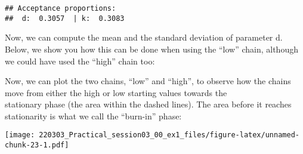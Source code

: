 \documentclass[
]{article}
\newenvironment{Shaded}{\begin{snugshade}}{\end{snugshade}}
\newcommand{\AttributeTok}[1]{\textcolor[rgb]{0.77,0.63,0.00}{#1}}
\newcommand{\CommentTok}[1]{\textcolor[rgb]{0.56,0.35,0.01}{\textit{#1}}}
\newcommand{\DecValTok}[1]{\textcolor[rgb]{0.00,0.00,0.81}{#1}}
\newcommand{\FloatTok}[1]{\textcolor[rgb]{0.00,0.00,0.81}{#1}}
\newcommand{\FunctionTok}[1]{\textcolor[rgb]{0.00,0.00,0.00}{#1}}
\newcommand{\NormalTok}[1]{#1}
\newcommand{\OtherTok}[1]{\textcolor[rgb]{0.56,0.35,0.01}{#1}}
\newcommand{\SpecialCharTok}[1]{\textcolor[rgb]{0.00,0.00,0.00}{#1}}
\newcommand{\StringTok}[1]{\textcolor[rgb]{0.31,0.60,0.02}{#1}}
\begin{document}
\begin{verbatim}
## Acceptance proportions:
##  d:  0.3057  | k:  0.3083
\end{verbatim}

Now, we can compute the mean and the standard deviation of parameter d.
Below, we show you how this can be done when using the ``low'' chain,
although we could have used the ``high'' chain too:

\begin{Shaded}
\end{Shaded}

Now, we can plot the two chains, ``low'' and ``high'', to observe how
the chains move from either the high or low starting values towards
the\\
stationary phase (the area within the dashed lines). The area before it
reaches stationarity is what we call the ``burn-in'' phase:

\begin{Shaded}
\end{Shaded}

\texttt{[image: 220303\_Practical\_session03\_00\_ex1\_files/figure-latex/unnamed-chunk-23-1.pdf]}
\end{document}
